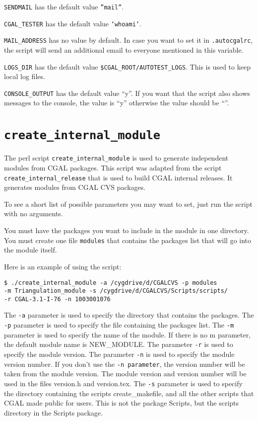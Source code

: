 {\tt SENDMAIL} has the default value {\tt ''mail''}.

{\tt CGAL\_TESTER} has the default value {\tt `whoami`}.

{\tt MAIL\_ADDRESS} has no value by default. In case you want to
set it in {\tt .autocgalrc}, the script will send an additional email to
everyone mentioned in this variable.    

{\tt LOGS\_DIR} has the default value {\tt \$CGAL\_ROOT/AUTOTEST\_LOGS}.  This
is used to keep local log files.

{\tt CONSOLE\_OUTPUT} has the default value ``y''. If you want that the script
 also shows messages to the console, the value is ``y'' otherwise the value 
should be ``''.




\section{{\tt create\_internal\_module}}
\label{sec:create_internal_module}

The perl script {\tt create\_internal\_module} is used to generate independent
 modules from CGAL packages. This script was adapted from the script {\tt 
create\_internal\_release} that is used to build CGAL internal releases.
It generates modules from CGAL CVS packages.

To see a short list of possible parameters you may want to set, just run the 
script with no arguments.   

You must have the packages you want to include in the module in one directory. 
You must create one file {\tt modules} that contains the packages list that 
will go into the module itself.

Here is an example of using the script:
\begin{verbatim}
$ ./create_internal_module -a /cygdrive/d/CGALCVS -p modules 
-m Triangulation_module -s /cygdrive/d/CGALCVS/Scripts/scripts/
-r CGAL-3.1-I-76 -n 1003001076 
\end{verbatim}


The {\tt -a} parameter is used to specify the directory that contains the packages. 
The {\tt -p} parameter is used to specify the file containing the packages list. 
The {\tt -m} parameter is used to specify the name of the module. If there is no m parameter, the default module name is NEW\_MODULE.   
The parameter {\tt -r} is used to specify the module version. 
The parameter {\tt -n} is used to specify the module version number. If you don't use the {\tt -n parameter}, the version number will be taken from the module version. The module version and version number will be used in the files version.h and version.tex. 
The {\tt -s} parameter is used to specify the directory containing the scripts create\_makefile, and all the other scripts that CGAL made public for users. This is not the package Scripts, but the scripts directory in the Scripts package.  

